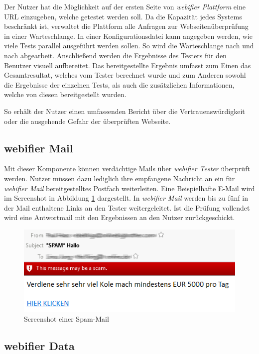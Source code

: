 Der Nutzer hat die Möglichkeit auf der ersten Seite von \textit{webifier Plattform} eine \acs{URL}
einzugeben, welche getestet werden soll. Da die Kapazität jedes Systems beschränkt ist, verwaltet die
Plattform alle Anfragen zur Webseitenüberprüfung in einer Warteschlange. In einer
Konfigurationsdatei kann angegeben werden, wie viele Tests parallel ausgeführt werden sollen. So
wird die Warteschlange nach und nach abgearbeit. Anschließend werden die Ergebnisse des Testers für
den Benutzer visuell aufbereitet. Das bereitgestellte Ergebnis umfasst zum Einen das Gesamtresultat, welches vom Tester berechnet wurde und zum Anderen sowohl die Ergebnisse der einzelnen Tests, als auch die zusätzlichen Informationen, welche von diesen bereitgestellt wurden.

So erhält der Nutzer einen umfassenden Bericht über die Vertrauenswürdigkeit oder die ausgehende Gefahr der überprüften Webseite.

\subsection{webifier Mail}
Mit dieser Komponente können verdächtige Mails über \textit{webifier Tester} überprüft werden.
Nutzer müssen dazu lediglich ihre empfangene Nachricht an ein für \textit{webifier Mail}
bereitgestelltes Postfach weiterleiten. Eine Beispielhafte E-Mail wird im Screenshot in
Abbildung \ref{fig:spam-mail} dargestellt. In \textit{webifier Mail} werden bis zu fünf in der
Mail enthaltene Links an den Tester weitergeleitet. Ist die Prüfung vollendet wird eine Antwortmail
mit den Ergebnissen an den Nutzer zurückgeschickt.

\begin{figure}[H]
	\centering
	\includegraphics[width=12cm]{images/spam-mail.png}
	\caption{Screenshot einer Spam-Mail}
	\label{fig:spam-mail}
\end{figure}

\subsection{webifier Data}
\label{sec:konzept-data}

